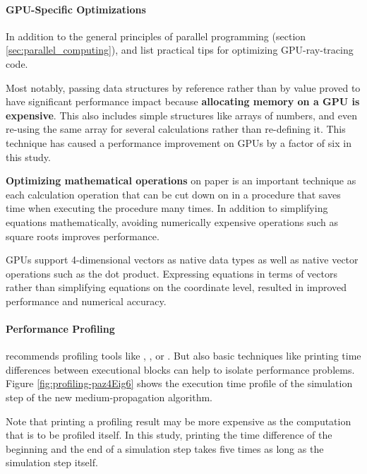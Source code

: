 \paragraph{GPU-Specific Optimizations}
In addition to the general principles of parallel programming (section \ref{sec:parallel_computing}),  and  \cite{raytracingtips} list practical tips for optimizing GPU-ray-tracing code.

Most notably, passing data structures by reference rather than by value proved to have significant performance impact because \textbf{allocating memory on a GPU is expensive}. This also includes simple structures like arrays of numbers, and even re-using the same array for several calculations rather than re-defining it. This technique has caused a performance improvement on GPUs by a factor of six in this study.


\textbf{Optimizing mathematical operations} on paper is an important technique as each calculation operation that can be cut down on in a procedure that saves time when executing the procedure many times. In addition to simplifying equations mathematically, avoiding numerically expensive operations such as square roots improves performance.

GPUs support 4-dimensional vectors as native data types as well as native vector operations such as the dot product. Expressing equations in terms of vectors rather than simplifying equations on the coordinate level, resulted in improved performance and numerical accuracy.



\paragraph{Performance Profiling}
 recommends profiling tools like , , or  \cite{cudacourse}. But also basic techniques like printing time differences between executional blocks can help to isolate performance problems. Figure \ref{fig:profiling-paz4Eig6} shows the execution time profile of the simulation step of the new medium-propagation algorithm.

Note that printing a profiling result may be more expensive as the computation that is to be profiled itself. In this study, printing the time difference of the beginning and the end of a simulation step takes five times as long as the simulation step itself.

